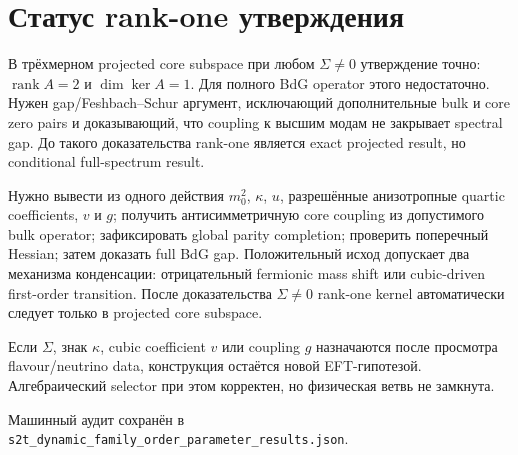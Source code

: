 \section{Статус rank-one утверждения}

В трёхмерном projected core subspace при любом \(\Sigma\ne0\) утверждение
точно: \(\operatorname{rank}A=2\) и \(\dim\ker A=1\). Для полного BdG operator
этого недостаточно. Нужен gap/Feshbach--Schur аргумент, исключающий
дополнительные bulk и core zero pairs и доказывающий, что coupling к высшим
модам не закрывает spectral gap. До такого доказательства rank-one является
exact projected result, но conditional full-spectrum result.

\begin{protocol}
Нужно вывести из одного действия \(m_0^2\), \(\kappa\), \(u\), разрешённые
анизотропные quartic coefficients, \(v\) и \(g\); получить антисимметричную
core coupling из допустимого bulk operator; зафиксировать global parity
completion; проверить поперечный Hessian; затем доказать full BdG gap.
Положительный исход допускает два механизма конденсации: отрицательный
fermionic mass shift или cubic-driven first-order transition. После
доказательства \(\Sigma\ne0\) rank-one kernel автоматически следует только
в projected core subspace.
\end{protocol}

\begin{nogocriterion}
Если \(\Sigma\), знак \(\kappa\), cubic coefficient \(v\) или coupling
\(g\) назначаются после просмотра flavour/neutrino data, конструкция остаётся
новой EFT-гипотезой. Алгебраический selector при этом корректен, но физическая
ветвь не замкнута.
\end{nogocriterion}

Машинный аудит сохранён в
\texttt{s2t\_dynamic\_family\_order\_parameter\_results.json}.